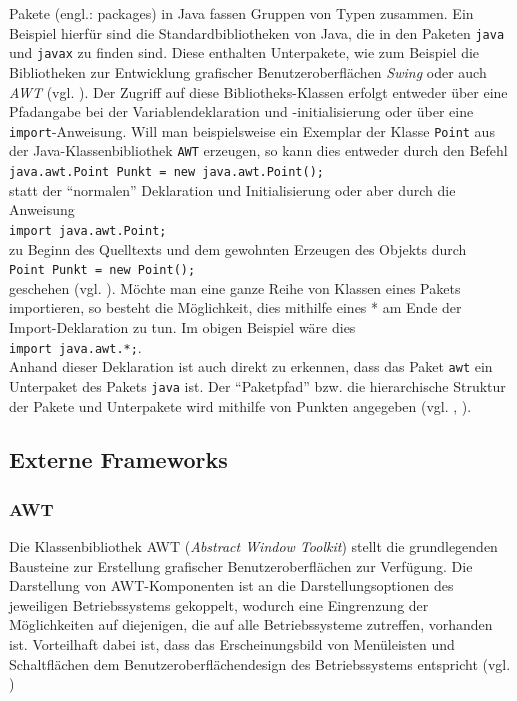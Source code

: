 \documentclass[paper=a4, DIV=calc, BCOR=12mm, twoside=on, onecolumn=on, open = right, titlepage =on, parskip =half-, headsepline = on, footsepline = off, chapterprefix = off, appendixprefix = on, fontsize = 12pt, numbers = noenddot, abstract = on]{scrbook}
\begin{document}
Pakete (engl.: packages) in Java fassen Gruppen von Typen zusammen. Ein Beispiel hierfür sind die Standardbibliotheken von Java, die in den Paketen \texttt{java} und \texttt{javax} zu finden sind. Diese enthalten Unterpakete, wie zum Beispiel die Bibliotheken zur Entwicklung grafischer Benutzeroberflächen \emph{Swing} oder auch \emph{AWT} (vgl. \cite[S.265]{ullenboom:12}).
Der Zugriff auf diese Bibliotheks-Klassen erfolgt entweder über eine Pfadangabe bei der Variablendeklaration und -initialisierung oder über eine \texttt{import}-Anweisung. Will man beispielsweise ein Exemplar der Klasse \texttt{Point} aus der Java-Klassenbibliothek \texttt{AWT} erzeugen, so kann dies entweder durch den Befehl\\
\hspace*{2em} \texttt{java.awt.Point Punkt = new java.awt.Point();}\\
statt der "`normalen"' Deklaration und Initialisierung oder aber durch die Anweisung\\ \hspace*{2em} \texttt{import java.awt.Point;}\\
zu Beginn des Quelltexts und dem gewohnten Erzeugen des Objekts durch\\
\hspace*{2em} \texttt{Point Punkt = new Point();}\\
geschehen (vgl. \cite[S.266]{ullenboom:12}).
Möchte man eine ganze Reihe von Klassen eines Pakets importieren, so besteht die Möglichkeit, dies mithilfe eines * am Ende der Import-Deklaration zu tun. Im obigen Beispiel wäre dies\\
\hspace*{2em} \texttt{import java.awt.*;}.\\
Anhand dieser Deklaration ist auch direkt zu erkennen, dass das Paket \texttt{awt} ein Unterpaket des Pakets \texttt{java} ist. Der "`Paketpfad"' bzw. die hierarchische Struktur der Pakete und Unterpakete wird mithilfe von Punkten angegeben (vgl. \cite[S.265ff.]{ullenboom:12}, \cite[S.84ff.]{abts:15}).


\subsection{Externe Frameworks}

\subsubsection*{AWT}

Die Klassenbibliothek AWT (\emph{Abstract Window Toolkit}) stellt die grundlegenden Bausteine zur Erstellung grafischer Benutzeroberflächen zur Verfügung. Die Darstellung von AWT-Komponenten ist an die Darstellungsoptionen des jeweiligen Betriebssystems gekoppelt, wodurch eine Eingrenzung der Möglichkeiten auf diejenigen, die auf alle Betriebssysteme zutreffen, vorhanden ist. Vorteilhaft dabei ist, dass das Erscheinungsbild von Menüleisten und Schaltflächen dem Benutzeroberflächendesign des Betriebssystems entspricht (vgl. \cite[S.279]{abts:15})
\end{document}
